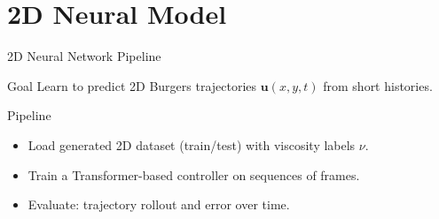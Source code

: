 \section{2D Neural Model}

\begin{secframe}
\small
\textcolor{red_unipd}{\Large 2D Neural Network Pipeline}

\vspace{0.6em}

\begin{block}{Goal}
Learn to predict 2D Burgers trajectories $\mathbf{u}(x,y,t)$ from short histories.
\end{block}

\begin{block}{Pipeline}
\begin{itemize}
  \item Load generated 2D dataset (train/test) with viscosity labels $\nu$.
  \item Train a Transformer-based controller on sequences of frames.
  \item Evaluate: trajectory rollout and error over time.
\end{itemize}
\end{block}

\end{secframe}







